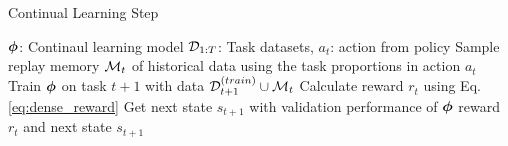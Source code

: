 
\begin{algorithm}[t]
   \caption{Continual Learning Step}
   \label{alg:continual_learning_step}
\begin{algorithmic}[1]
   \Require ${\bm{\phi}}$: Continaul learning model
   \Require ${\mathcal{D}}_{1:T}$: Task datasets, $a_t$: action from policy
   \State Sample replay memory ${\mathcal{M}}_t$ of historical data using the task proportions in action $a_t$ 
   \State Train ${\bm{\phi}}$ on task $t+1$ with data ${\mathcal{D}}_{t+1}^{(train)} \cup {\mathcal{M}}_t$
   \State Calculate reward $r_t$ using Eq. \ref{eq:dense_reward}
   \State Get next state $s_{t+1}$ with validation performance of ${\bm{\phi}}$ 
   \Return reward $r_t$ and next state $s_{t+1}$ 
\end{algorithmic}
\end{algorithm}